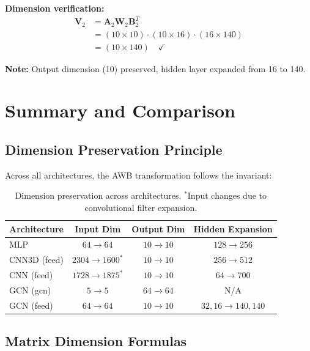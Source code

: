 \documentclass[11pt]{article}
\begin{document}
\textbf{Dimension verification:}
\begin{align}
\mathbf{V}_2 &= \mathbf{A}_2 \mathbf{W}_2 \mathbf{B}_2^T \\
&= (10 \times 10) \cdot (10 \times 16) \cdot (16 \times 140) \\
&= (10 \times 140) \quad \checkmark
\end{align}

\textbf{Note:} Output dimension (10) preserved, hidden layer expanded from 16 to 140.

\newpage

\section{Summary and Comparison}

\subsection{Dimension Preservation Principle}

Across all architectures, the AWB transformation follows the invariant:

\begin{center}
\end{center}

\begin{table}[h]
\centering
\begin{tabular}{@{}lccc@{}}
\toprule
\textbf{Architecture} & \textbf{Input Dim} & \textbf{Output Dim} & \textbf{Hidden Expansion} \\
\midrule
MLP & $64 \rightarrow 64$ & $10 \rightarrow 10$ & $128 \rightarrow 256$ \\
CNN3D (feed) & $2304 \rightarrow 1600^*$ & $10 \rightarrow 10$ & $256 \rightarrow 512$ \\
CNN (feed) & $1728 \rightarrow 1875^*$ & $10 \rightarrow 10$ & $64 \rightarrow 700$ \\
GCN (gcn) & $5 \rightarrow 5$ & $64 \rightarrow 64$ & N/A \\
GCN (feed) & $64 \rightarrow 64$ & $10 \rightarrow 10$ & $32,16 \rightarrow 140,140$ \\
\bottomrule
\end{tabular}
\caption{Dimension preservation across architectures. $^*$Input changes due to convolutional filter expansion.}
\end{table}

\subsection{Matrix Dimension Formulas}
\end{document}
